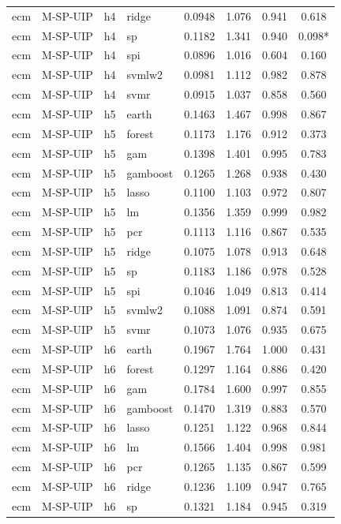 \begin{ThreePartTable}
\begin{longtable}[t]{llclcccc}
ecm & M-SP-UIP & h4 & ridge & 0.0948 & 1.076 & 0.941 & 0.618\\
ecm & M-SP-UIP & h4 & sp & 0.1182 & 1.341 & 0.940 & 0.098*\\
ecm & M-SP-UIP & h4 & spi & 0.0896 & 1.016 & 0.604 & 0.160\\
ecm & M-SP-UIP & h4 & svmlw2 & 0.0981 & 1.112 & 0.982 & 0.878\\
ecm & M-SP-UIP & h4 & svmr & 0.0915 & 1.037 & 0.858 & 0.560\\
\addlinespace
ecm & M-SP-UIP & h5 & earth & 0.1463 & 1.467 & 0.998 & 0.867\\
ecm & M-SP-UIP & h5 & forest & 0.1173 & 1.176 & 0.912 & 0.373\\
ecm & M-SP-UIP & h5 & gam & 0.1398 & 1.401 & 0.995 & 0.783\\
ecm & M-SP-UIP & h5 & gamboost & 0.1265 & 1.268 & 0.938 & 0.430\\
ecm & M-SP-UIP & h5 & lasso & 0.1100 & 1.103 & 0.972 & 0.807\\
ecm & M-SP-UIP & h5 & lm & 0.1356 & 1.359 & 0.999 & 0.982\\
ecm & M-SP-UIP & h5 & pcr & 0.1113 & 1.116 & 0.867 & 0.535\\
ecm & M-SP-UIP & h5 & ridge & 0.1075 & 1.078 & 0.913 & 0.648\\
ecm & M-SP-UIP & h5 & sp & 0.1183 & 1.186 & 0.978 & 0.528\\
ecm & M-SP-UIP & h5 & spi & 0.1046 & 1.049 & 0.813 & 0.414\\
ecm & M-SP-UIP & h5 & svmlw2 & 0.1088 & 1.091 & 0.874 & 0.591\\
ecm & M-SP-UIP & h5 & svmr & 0.1073 & 1.076 & 0.935 & 0.675\\
\addlinespace
ecm & M-SP-UIP & h6 & earth & 0.1967 & 1.764 & 1.000 & 0.431\\
ecm & M-SP-UIP & h6 & forest & 0.1297 & 1.164 & 0.886 & 0.420\\
ecm & M-SP-UIP & h6 & gam & 0.1784 & 1.600 & 0.997 & 0.855\\
ecm & M-SP-UIP & h6 & gamboost & 0.1470 & 1.319 & 0.883 & 0.570\\
ecm & M-SP-UIP & h6 & lasso & 0.1251 & 1.122 & 0.968 & 0.844\\
ecm & M-SP-UIP & h6 & lm & 0.1566 & 1.404 & 0.998 & 0.981\\
ecm & M-SP-UIP & h6 & pcr & 0.1265 & 1.135 & 0.867 & 0.599\\
ecm & M-SP-UIP & h6 & ridge & 0.1236 & 1.109 & 0.947 & 0.765\\
ecm & M-SP-UIP & h6 & sp & 0.1321 & 1.184 & 0.945 & 0.319\\

\end{longtable}
\end{ThreePartTable}
